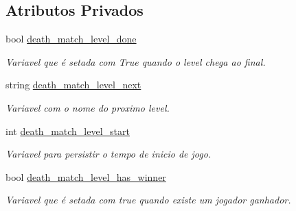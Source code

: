 \subsection*{Atributos Privados}
\begin{DoxyCompactItemize}
\item 
\mbox{\label{classDeathMatchLevel_a9c5afea6c31d61547042149f3d82c9f9}} 
bool \mbox{\hyperlink{classDeathMatchLevel_a9c5afea6c31d61547042149f3d82c9f9}{death\+\_\+match\+\_\+level\+\_\+done}}
\begin{DoxyCompactList}\small\item\em Variavel que é setada com True quando o level chega ao final. \end{DoxyCompactList}\item 
\mbox{\label{classDeathMatchLevel_a970c89076994b15001bf01375b43b9b7}} 
string \mbox{\hyperlink{classDeathMatchLevel_a970c89076994b15001bf01375b43b9b7}{death\+\_\+match\+\_\+level\+\_\+next}}
\begin{DoxyCompactList}\small\item\em Variavel com o nome do proximo level. \end{DoxyCompactList}\item 
\mbox{\label{classDeathMatchLevel_aa8e4a5b754287884d0ca54643e0fdec0}} 
int \mbox{\hyperlink{classDeathMatchLevel_aa8e4a5b754287884d0ca54643e0fdec0}{death\+\_\+match\+\_\+level\+\_\+start}}
\begin{DoxyCompactList}\small\item\em Variavel para persistir o tempo de inicio de jogo. \end{DoxyCompactList}\item 
\mbox{\label{classDeathMatchLevel_a1c75c054a33e65e4f39fed65cfd89710}} 
bool \mbox{\hyperlink{classDeathMatchLevel_a1c75c054a33e65e4f39fed65cfd89710}{death\+\_\+match\+\_\+level\+\_\+has\+\_\+winner}}
\begin{DoxyCompactList}\small\item\em Variavel que é setada com true quando existe um jogador ganhador. \end{DoxyCompactList}\item 
\mbox{\label{classDeathMatchLevel_aafe478e224732978a08161ab877a50aa}} 

\end{DoxyCompactItemize}
